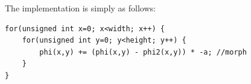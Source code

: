 The implementation is simply as follows:
\begin{lstlisting}
for(unsigned int x=0; x<width; x++) {
    for(unsigned int y=0; y<height; y++) {
        phi(x,y) += (phi(x,y) - phi2(x,y)) * -a; //morph
    }
}
\end{lstlisting}



